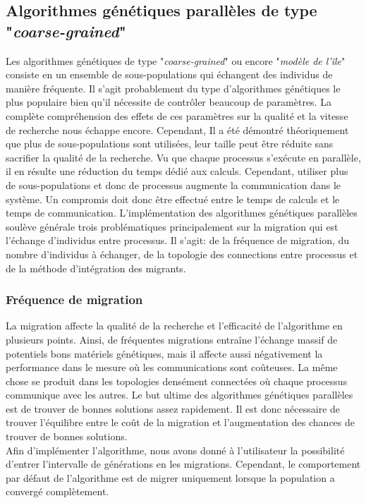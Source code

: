 \documentclass[12pt,a4paper]{article}
\begin{document}
	\subsection{Algorithmes génétiques parallèles de type "\emph{coarse-grained}"}
	Les algorithmes génétiques de type "\emph{coarse-grained}" ou encore "\emph{modèle de l'île}" consiste en un ensemble de sous-populations qui échangent des individus de manière fréquente. Il s'agit probablement du type d'algorithmes génétiques le plus populaire bien qu'il nécessite de contrôler beaucoup de paramètres. La complète compréhension des effets de ces paramètres sur la qualité et la vitesse de recherche nous échappe encore. Cependant, Il a été démontré théoriquement que plus de sous-populations sont utilisées, leur taille peut être réduite sans sacrifier la qualité de la recherche. Vu que chaque processus s'exécute en parallèle, il en résulte une réduction du temps dédié aux calculs. Cependant, utiliser plus de sous-populations et donc de processus augmente la communication dans le système. Un compromis doit donc être effectué entre le temps de calculs et le temps de communication. L'implémentation des algorithmes génétiques parallèles soulève générale trois problématiques principalement sur la migration qui est l'échange d'individus entre processus. Il s'agit: de la fréquence de migration, du nombre d'individus à échanger, de la topologie des connections entre processus et de la méthode d'intégration des migrants.
	\subsubsection{Fréquence de migration}
	La migration affecte la qualité de la recherche et l'efficacité de l'algorithme en plusieurs points. Ainsi, de fréquentes migrations entraîne l'échange massif de potentiels bons matériels génétiques, mais il affecte aussi négativement la performance dans le mesure où les communications sont coûteuses. La même chose se produit dans les topologies densément connectées où chaque processus communique avec les autres. Le but ultime des algorithmes génétiques parallèles est de trouver de bonnes solutions assez rapidement. Il est donc nécessaire de trouver l'équilibre entre le coût de la migration et l'augmentation des chances de trouver de bonnes solutions. \\
	\hspace*{.5cm} Afin d'implémenter l'algorithme, nous avons donné à l'utilisateur la possibilité d'entrer l'intervalle de générations en les migrations. Cependant, le comportement par défaut de l'algorithme est de migrer uniquement lorsque la population a convergé complètement.  
\end{document}
